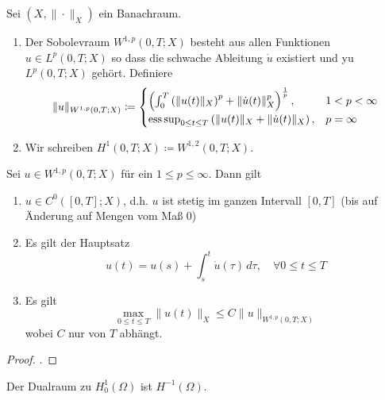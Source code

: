 \documentclass[../skript.tex]{subfiles}
\begin{document}

\begin{definition}\label{def:c4e2s4}
	Sei $(X,\|\cdot\|_X)$ ein Banachraum.
 	\begin{enumerate}
 		\item Der Sobolevraum $W^{1,p}(0,T;X)$ besteht aus allen Funktionen $u\in L^p(0,T;X)$
 			so dass die schwache Ableitung $\dot{u}$ existiert und yu $L^p(0,T;X)$ gehört. Definiere 
 			\[
 				\|u\|_{W^{1,p}(0,T;X)} \coloneqq 
 				\begin{cases} 
 					\left(\int_0^T\left(\|u(t)\|_X\right)^p + \|\dot{u}(t)\|_X^p\right)^{\frac{1}{p}} ,&1<p<\infty \\
 					\operatorname*{ess\,sup}_{0\leq t\leq T} \left( \|u(t)\|_X + \|\dot{u}(t)\|_X\right ), &p=\infty
 				\end{cases}
 			\]
 		\item Wir schreiben $H^1(0,T;X) \coloneqq W^{1,2}(0,T;X)$.
 	\end{enumerate}
\end{definition}

\begin{theorem}\label{thm:c4s2s5}
	Sei $u\in W^{1,p}(0,T;X)$ für ein $1\leq p\leq\infty$. Dann gilt
	\begin{enumerate}
		\item $u\in C^0([0,T];X)$, d.h. $u$ ist stetig im ganzen Intervall $[0,T]$ (bis auf Änderung auf Mengen vom Maß $0$)
		\item Es gilt der Hauptsatz
			\[
				u(t) = u(s) + \int_s^t \dot{u}(\tau)\,d\tau,\quad\forall 0\leq t\leq T
			\]
		\item Es gilt 
			\[
				\max_{0\leq t\leq T} \|u(t)\|_X \leq C\|u\|_{W^{1,p}(0,T;X)}
			\]
			wobei $C$ nur von $T$ abhängt. 
	\end{enumerate}
\end{theorem}

\begin{proof}
	\cite[S.286]{Evans}.
\end{proof}

\begin{remark*}
	Der Dualraum zu $H^1_0(\Omega)$ ist $H^{-1}(\Omega)$.
\end{remark*}
\end{document}
